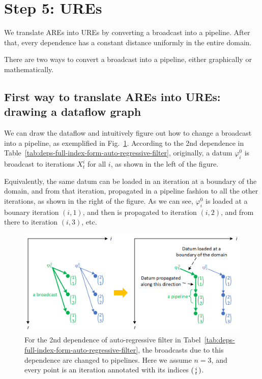 \section{Step 5: UREs}

We translate AREs into UREs by converting a broadcast into a pipeline. After that, every dependence has a constant distance uniformly in the entire domain.

There are two ways to convert a broadcast into a pipeline, either graphically or mathematically. 

\subsection{First way to translate AREs into UREs: drawing a dataflow graph}
\label{sec:are-to-ures-with-dfg}

We can draw the dataflow and intuitively figure out how to change a broadcast into a pipeline, as exemplified in Fig.~\ref{fig:broadcast-to-pipeline-arf}. According to the 2nd dependence in Table~\ref{tab:deps-full-index-form-auto-regressive-filter}, originally, a datum $\varphi_i^0$ is broadcast to iterations $X_t^i$ for all $i$, as shown in the left of the figure. 

Equivalently, the same datum can be loaded in an iteration at a boundary of the domain, and from that iteration, propagated in a pipeline fashion to all the other iterations, as shown in the right of the figure. As we can see, $\varphi_i^0$ is  loaded at a bounary iteration $(i, 1)$, and then is propagated to iteration $(i, 2)$, and from there to iteration $(i, 3)$, etc. 

\begin{figure}[!ht]
    \centering
    \includegraphics[width=\textwidth]{./img/broadcast-to-pipeline-arf.png}
    \caption{For the 2nd dependence of auto-regressive filter in Tabel~\ref{tab:deps-full-index-form-auto-regressive-filter}, the broadcasts due to this dependence are changed to pipelines. Here we assume $n=3$, and every point is an iteration annotated with its indices $\begin{psmallmatrix} i\\ t\end{psmallmatrix}$.}
    \label{fig:broadcast-to-pipeline-arf}
\end{figure}

